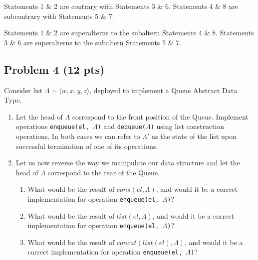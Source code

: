 \documentclass[12pt]{article}
\begin{document}
\noindent Statements 1 \& 2 are contrary with Statements 3 \& 6. Statements 4 \& 8 are subcontrary with Statements 5 \& 7.

\noindent Statements 1 \& 2 are superalterns to the subaltern Statements 4 \& 8. Statements 3 \& 6 are superalterns to the subaltern Statements 5 \& 7.





\newpage

\subsection{Problem 4 (12 pts)}

Consider list $\Lambda = \langle w, x, y, z \rangle$, deployed to implement a Queue Abstract Data Type.

\begin{enumerate}

\item Let the head of $\Lambda$ correspond to the front position of the Queue. Implement operations \texttt{enqueue(el, $\Lambda$)} and \texttt{dequeue($\Lambda$)} using list construction operations. In both cases we can refer to $\Lambda'$ as the state of the list upon successful termination of one of its operations.

\item Let us now reverse the way we manipulate our data structure and let the head of $\Lambda$ correspond to the rear of the Queue.
\begin{enumerate}
\item What would be the result of $cons(el, \Lambda)$, and would it be a correct implementation for operation \texttt{enqueue(el, $\Lambda$)}?
\item What would be the result of $list(el, \Lambda)$, and would it be a correct implementation for operation \texttt{enqueue(el, $\Lambda$)}?
\item What would be the result of $concat(list(el), \Lambda)$, and would it be a correct implementation for operation \texttt{enqueue(el, $\Lambda$)}?
\end{enumerate}
\end{enumerate}
\end{document}
